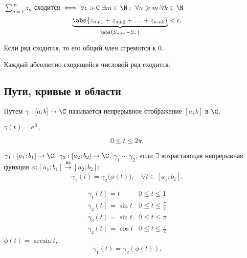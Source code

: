 \begin{crit}
  $\sum_{n=1}^{\infty }z_n$ сходится $\iff \forall \epsilon > 0 \ \exists m \in \N: \ \forall n \geqslant m \ \forall k \in \N$
  \[
    \underbrace{\abs{z_{n+1}+z_{n+2}+\ldots+z_{n+k}}}_{\abs{S_{n+k}-S_n}} < \epsilon.
  \]
\end{crit}

\begin{corollary}
  Если ряд сходится, то его общий член стремится к $0$.
\end{corollary}

\begin{corollary}
  Каждый абсолютно сходящийся числовой ряд сходится.
\end{corollary}

\subsection{Пути, кривые и области}

\begin{definition}[Путь]
  Путем $\gamma:[a ; b] \rightarrow \C$ называется непрерывное отображение $[a ; b]$ в $\C$.
\end{definition}

\begin{eg}
  $\gamma(t) = e^{it},$
  \begin{multicols}{2}
    \begin{figure}[H]
      \centering
      \label{fig:fig-7}
    \end{figure}

    \columnbreak

    \[
      0 \leqslant t \leqslant 2\pi.
    \]
  \end{multicols}
\end{eg}

\begin{definition}
  $\gamma_1 : [a_1 ; b_1] \rightarrow \C, \ \gamma_2 : [a_2 ; b_2] \rightarrow \C$. $\gamma_1 \sim \gamma_2$, если $\exists $ возрастающая непрерывная функция $\phi: [a_1 ; b_1] \xrightarrow[]{\text{на}} [a_2 ; b_2]:$
  \[
    \gamma_1(t) = \gamma_2\big(\phi(t)\big), \quad \forall t \in [a_1 ; b_1].
  \]
\end{definition}

\begin{eg}
  \begin{multicols}{2}
    \[
      \begin{array}{ll}
        \gamma_1(t) = t & 0 \leqslant t \leqslant 1 \\
        \gamma_2(t) = \sin t & 0 \leqslant t \leqslant \frac{\pi}{2} \\
        \gamma_3(t) = \sin t & 0 \leqslant t \leqslant \pi \\
        \gamma_4(t) = \cos t & 0 \leqslant t \leqslant \frac{\pi}{2}
      \end{array}
    \]
    $\phi(t) = \arcsin t$,
    \[
      \gamma_1(t) = \gamma_2\left(\phi(t)\right).
    \]
    \begin{figure}[H]
      \centering
      \label{fig:fig-8}
    \end{figure}
  \end{multicols}
\end{eg}

